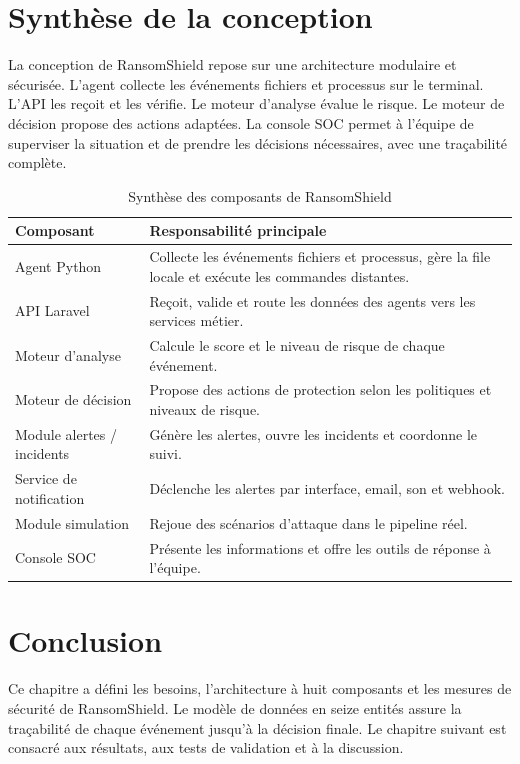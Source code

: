 \section{Synthèse de la conception}

La conception de RansomShield repose sur une architecture modulaire et sécurisée. L'agent collecte les événements fichiers et processus sur le terminal. L'API les reçoit et les vérifie. Le moteur d'analyse évalue le risque. Le moteur de décision propose des actions adaptées. La console SOC permet à l'équipe de superviser la situation et de prendre les décisions nécessaires, avec une traçabilité complète.

\begin{table}[htbp]
\centering
\caption{Synthèse des composants de RansomShield}
\label{tab:synthese-composants}
\small
\renewcommand{\arraystretch}{1.3}
\begin{tabularx}{\textwidth}{|p{4.5cm}|X|}
\hline
\textbf{Composant} & \textbf{Responsabilité principale} \\
\hline
Agent Python & Collecte les événements fichiers et processus, gère la file locale et exécute les commandes distantes. \\
\hline
API Laravel & Reçoit, valide et route les données des agents vers les services métier. \\
\hline
Moteur d'analyse & Calcule le score et le niveau de risque de chaque événement. \\
\hline
Moteur de décision & Propose des actions de protection selon les politiques et niveaux de risque. \\
\hline
Module alertes / incidents & Génère les alertes, ouvre les incidents et coordonne le suivi. \\
\hline
Service de notification & Déclenche les alertes par interface, email, son et webhook. \\
\hline
Module simulation & Rejoue des scénarios d'attaque dans le pipeline réel. \\
\hline
Console SOC & Présente les informations et offre les outils de réponse à l'équipe. \\
\hline
\end{tabularx}
\end{table}

{}
\section*{Conclusion}

Ce chapitre a défini les besoins, l'architecture à huit composants et les mesures de sécurité de RansomShield. Le modèle de données en seize entités assure la traçabilité de chaque événement jusqu'à la décision finale. Le chapitre suivant est consacré aux résultats, aux tests de validation et à la discussion.